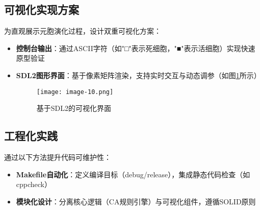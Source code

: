 \documentclass[forprint]{WHUBachelor}
\begin{document}
\subsection{可视化实现方案}
为直观展示元胞演化过程，设计双重可视化方案：
\begin{itemize}
    \item \textbf{控制台输出}：通过ASCII字符（如"□"表示死细胞，"■"表示活细胞）实现快速原型验证
    \item \textbf{SDL2图形界面}：基于像素矩阵渲染，支持实时交互与动态调参（如图\ref{fig:gui}所示）
    \begin{figure}[h]
        \centering
        \texttt{[image: image-10.png]}
        \caption{基于SDL2的可视化界面}
        \label{fig:gui}
    \end{figure}
\end{itemize}

\subsection{工程化实践}
通过以下方法提升代码可维护性：
\begin{itemize}
    \item \textbf{Makefile自动化}：定义编译目标（debug/release），集成静态代码检查（如cppcheck）
    \item \textbf{模块化设计}：分离核心逻辑（CA规则引擎）与可视化组件，遵循SOLID原则
\end{itemize}











\end{document}
